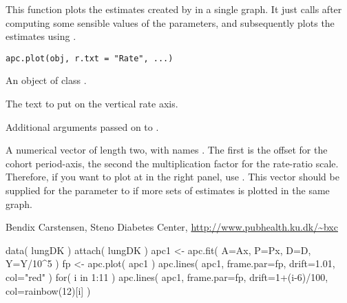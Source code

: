 \begin{Description}\relax
This function plots the estimates created by  in a single 
graph. It just calls  after computing some sensible 
values of the parameters, and subsequently plots the estimates using 
.
\end{Description}
\begin{Usage}
\begin{verbatim}
apc.plot(obj, r.txt = "Rate", ...)
\end{verbatim}
\end{Usage}
\begin{Arguments}
\begin{ldescription}
\item[\code{obj}] An object of class . 
\item[\code{r.txt}] The text to put on the vertical rate axis. 
\item[\code{...}] Additional arguments passed on to . 
\end{ldescription}
\end{Arguments}
\begin{Value}
A numerical vector of length two, with names
. The first is the offset for the cohort
period-axis, the second the multiplication factor for the rate-ratio
scale. Therefore, if you want to plot at  in the right panel,
use .
This vector should be supplied for the parameter  to
 if more sets of estimates is plotted in the
same graph.
\end{Value}
\begin{Author}\relax
Bendix Carstensen, Steno Diabetes Center,
\url{http://www.pubhealth.ku.dk/~bxc}
\end{Author}
\begin{SeeAlso}\relax
{}
\end{SeeAlso}
\begin{Examples}
\begin{ExampleCode}
data( lungDK )
attach( lungDK )
apc1 <- apc.fit( A=Ax, P=Px, D=D, Y=Y/10^5 )
fp <- apc.plot( apc1 )
apc.lines( apc1, frame.par=fp, drift=1.01, col="red" )
for( i in 1:11 )
  apc.lines( apc1, frame.par=fp, drift=1+(i-6)/100, col=rainbow(12)[i] )
\end{ExampleCode}
\end{Examples}

